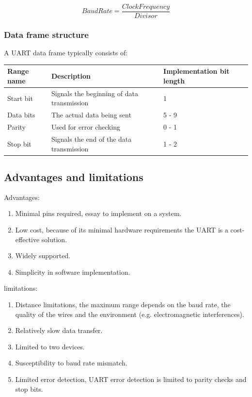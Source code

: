 \documentclass[12pt]{article}
\begin{document}
\[Baud Rate = \frac{Clock Frequency}{Divisor}\]

\subsubsection{Data frame structure}
A UART data frame typically consists of: \\

\begin{table}[h]
  \centering
  \begin{tabular}{|p{3cm}|p{6cm}|p{3.5cm}|}
    \hline
    \rowcolor{light-gray}\textbf{Range name} & \textbf{Description} & \textbf{Implementation bit length} \\
    \hline
    Start bit & Signals the beginning of data transmission & 1 \\
    \hline
    Data bits & The actual data being sent & 5 - 9 \\
    \hline
    Parity & Used for error checking & 0 - 1 \\
    \hline
    Stop bit & Signals the end of the data transmission & 1 - 2 \\
    \hline
  \end{tabular}
\end{table}

\subsection{Advantages and limitations}
Advantages:
\begin{enumerate}
  \item Minimal pins required, essay to implement on a system.
  \item Low cost, because of its minimal hardware requirements the UART is a
        cost-effective solution.
  \item Widely supported.
  \item Simplicity in software implementation.
\end{enumerate}
limitations:
\begin{enumerate}
  \item Distance limitations, the maximum range depends on the baud rate, the quality
        of the wires and the environment (e.g. electromagnetic interferences).
  \item Relatively slow data transfer.
  \item Limited to two devices.
  \item Susceptibility to baud rate mismatch.
  \item Limited error detection, UART error detection is limited to parity checks and
        stop bits.
\end{enumerate}
\newpage
\end{document}
